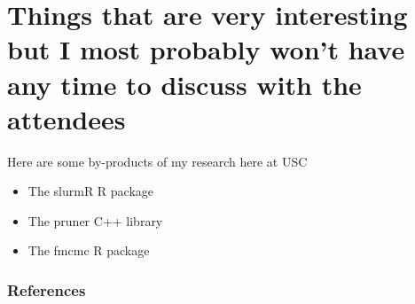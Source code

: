 \documentclass[aspectratio=169, 9pt, handout]{beamer}\usepackage[]{graphicx}\usepackage[]{color}
\begin{document}
\section{Things that are very interesting but I most probably won't have any time to discuss with the attendees}

\begin{frame}
Here are some by-products of my research here at USC

\begin{itemize}
\item The slurmR R package
\item The pruner C++ library
\item The fmcmc R package
\end{itemize}

\end{frame}

\renewcommand{\section}[2]{}%
\appendix
\begin{frame}[allowframebreaks]
\frametitle{References}


\end{frame}


\end{document}
